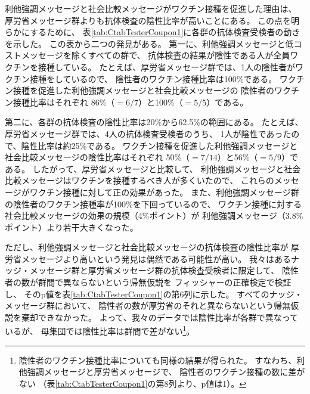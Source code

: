 \documentclass[
  11pt,
  a4paper,
]{article}
\begin{document}
利他強調メッセージと社会比較メッセージがワクチン接種を促進した理由は、
厚労省メッセージ群よりも抗体検査の陰性比率が高いことにある。
この点を明らかにするために、
表\ref{tab:CtabTesterCoupon1}に各群の抗体検査受検者の動きを示した。
この表から二つの発見がある。
第一に、利他強調メッセージと低コストメッセージを除くすべての群で、
抗体検査の結果が陰性である人が全員ワクチンを接種している。
たとえば、厚労省メッセージ群では、1人の陰性者がワクチン接種をしているので、
陰性者のワクチン接種比率は100\%である。
ワクチン接種を促進した利他強調メッセージと社会比較メッセージの
陰性者のワクチン接種比率はそれぞれ
86\%（\(=6/7\)）と100\%（\(=5/5\)）である。

第二に、各群の抗体検査の陰性比率は20\%から62.5\%の範囲にある。
たとえば、厚労省メッセージ群では、4人の抗体検査受検者のうち、
1人が陰性であったので、陰性比率は約25\%である。
ワクチン接種を促進した利他強調メッセージと社会比較メッセージの陰性比率はそれぞれ
50\%（\(=7/14\)）と56\%（\(=5/9\)）である。
したがって、厚労省メッセージと比較して、
利他強調メッセージと社会比較メッセージはワクチンを接種するべき人が多くいたので、
これらのメッセージがワクチン接種に対して正の効果があった。
また、利他強調メッセージ群の陰性者のワクチン接種率が100\%を下回っているので、
ワクチン接種に対する社会比較メッセージの効果の規模（4\%ポイント）が
利他強調メッセージ（3.8\%ポイント）より若干大きくなった。

ただし、利他強調メッセージと社会比較メッセージの抗体検査の陰性比率が
厚労省メッセージより高いという発見は偶然である可能性が高い。
我々はあるナッジ・メッセージ群と厚労省メッセージ群の抗体検査受検者に限定して、
陰性者の数が群間で異ならないという帰無仮説を
フィッシャーの正確検定で検証し、
そのp値を表\ref{tab:CtabTesterCoupon1}の第6列に示した。
すべてのナッジ・メッセージ群において、
陰性者の数が厚労省のそれと異ならないという帰無仮説を棄却できなかった。
よって、我々のデータでは陰性比率が各群で異なっているが、
母集団では陰性比率は群間で差がない\footnote{陰性者のワクチン接種比率についても同様の結果が得られた。
  すなわち、利他強調メッセージと厚労省メッセージで、
  陰性者のワクチン接種の数に差がない
  （表\ref{tab:CtabTesterCoupon1}の第8列より、p値は1）。}。
\end{document}
